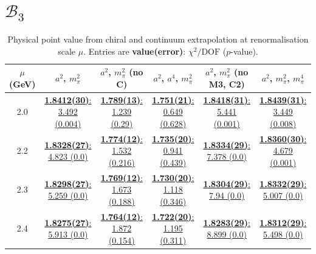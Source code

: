\documentclass[12pt]{extarticle}
\begin{document}
\section{$\mathcal{B}_3$}
\begin{table}[h!]
\begin{center}
\begin{tabular}{|c|c|c|c|c|c|}
\hline
$\mu$ (GeV) & $a^2$, $m_\pi^2$& $a^2$, $m_\pi^2$ (no C)& $a^2$, $a^4$, $m_\pi^2$& $a^2$, $m_\pi^2$ (no M3, C2)& $a^2$, $m_\pi^2$, $m_\pi^4$\\
\hline
2.0& \hyperlink{SSmPP/NPR/a2m2_20.pdf.1}{\textbf{1.8412(30)}: 3.492 (0.004)} & \hyperlink{SSmPP/NPR/a2m2noC_20.pdf.1}{\textbf{1.789(13)}: 1.239 (0.29)} & \hyperlink{SSmPP/NPR/a2a4m2_20.pdf.1}{\textbf{1.751(21)}: 0.649 (0.628)} & \hyperlink{SSmPP/NPR/a2m2mcut_20.pdf.1}{\textbf{1.8418(31)}: 5.441 (0.001)} & \hyperlink{SSmPP/NPR/a2m2m4_20.pdf.1}{\textbf{1.8439(31)}: 3.449 (0.008)}\\
2.2& \hyperlink{SSmPP/NPR/a2m2_22.pdf.1}{\textbf{1.8328(27)}: 4.823 (0.0)} & \hyperlink{SSmPP/NPR/a2m2noC_22.pdf.1}{\textbf{1.774(12)}: 1.532 (0.216)} & \hyperlink{SSmPP/NPR/a2a4m2_22.pdf.1}{\textbf{1.735(20)}: 0.941 (0.439)} & \hyperlink{SSmPP/NPR/a2m2mcut_22.pdf.1}{\textbf{1.8334(29)}: 7.378 (0.0)} & \hyperlink{SSmPP/NPR/a2m2m4_22.pdf.1}{\textbf{1.8360(30)}: 4.679 (0.001)}\\
2.3& \hyperlink{SSmPP/NPR/a2m2_23.pdf.1}{\textbf{1.8298(27)}: 5.259 (0.0)} & \hyperlink{SSmPP/NPR/a2m2noC_23.pdf.1}{\textbf{1.769(12)}: 1.673 (0.188)} & \hyperlink{SSmPP/NPR/a2a4m2_23.pdf.1}{\textbf{1.730(20)}: 1.118 (0.346)} & \hyperlink{SSmPP/NPR/a2m2mcut_23.pdf.1}{\textbf{1.8304(29)}: 7.94 (0.0)} & \hyperlink{SSmPP/NPR/a2m2m4_23.pdf.1}{\textbf{1.8332(29)}: 5.007 (0.0)}\\
2.4& \hyperlink{SSmPP/NPR/a2m2_24.pdf.1}{\textbf{1.8275(27)}: 5.913 (0.0)} & \hyperlink{SSmPP/NPR/a2m2noC_24.pdf.1}{\textbf{1.764(12)}: 1.872 (0.154)} & \hyperlink{SSmPP/NPR/a2a4m2_24.pdf.1}{\textbf{1.722(20)}: 1.195 (0.311)} & \hyperlink{SSmPP/NPR/a2m2mcut_24.pdf.1}{\textbf{1.8283(29)}: 8.899 (0.0)} & \hyperlink{SSmPP/NPR/a2m2m4_24.pdf.1}{\textbf{1.8312(29)}: 5.498 (0.0)}\\
\hline
\end{tabular}
\caption{Physical point value from chiral and continuum extrapolation at renormalisation scale $\mu$. Entries are \textbf{value(error)}: $\chi^2/\text{DOF}$ ($p$-value).}
\end{center}
\end{table}
\end{document}
